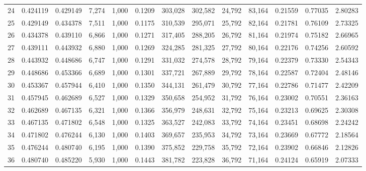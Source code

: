 \begin{tabular}{rrrrrrrrrrrrr}
24  &  0.424119 &  0.429149 &   7,274 &  1,000 &                                     0.1209 &  303,028 &  302,582 &   24,792 &   83,164 &  0.21559 &  0.77035 &  2.80283 \\
25  &  0.429149 &  0.434378 &   7,511 &  1,000 &                                     0.1175 &  310,539 &  295,071 &   25,792 &   82,164 &  0.21781 &  0.76109 &  2.73325 \\
26  &  0.434378 &  0.439110 &   6,866 &  1,000 &                                     0.1271 &  317,405 &  288,205 &   26,792 &   81,164 &  0.21974 &  0.75182 &  2.66965 \\
27  &  0.439111 &  0.443932 &   6,880 &  1,000 &                                     0.1269 &  324,285 &  281,325 &   27,792 &   80,164 &  0.22176 &  0.74256 &  2.60592 \\
28  &  0.443932 &  0.448686 &   6,747 &  1,000 &                                     0.1291 &  331,032 &  274,578 &   28,792 &   79,164 &  0.22379 &  0.73330 &  2.54343 \\
29  &  0.448686 &  0.453366 &   6,689 &  1,000 &                                     0.1301 &  337,721 &  267,889 &   29,792 &   78,164 &  0.22587 &  0.72404 &  2.48146 \\
30  &  0.453367 &  0.457944 &   6,410 &  1,000 &                                     0.1350 &  344,131 &  261,479 &   30,792 &   77,164 &  0.22786 &  0.71477 &  2.42209 \\
31  &  0.457945 &  0.462689 &   6,527 &  1,000 &                                     0.1329 &  350,658 &  254,952 &   31,792 &   76,164 &  0.23002 &  0.70551 &  2.36163 \\
32  &  0.462689 &  0.467135 &   6,321 &  1,000 &                                     0.1366 &  356,979 &  248,631 &   32,792 &   75,164 &  0.23213 &  0.69625 &  2.30308 \\
33  &  0.467135 &  0.471802 &   6,548 &  1,000 &                                     0.1325 &  363,527 &  242,083 &   33,792 &   74,164 &  0.23451 &  0.68698 &  2.24242 \\
34  &  0.471802 &  0.476244 &   6,130 &  1,000 &                                     0.1403 &  369,657 &  235,953 &   34,792 &   73,164 &  0.23669 &  0.67772 &  2.18564 \\
35  &  0.476244 &  0.480740 &   6,195 &  1,000 &                                     0.1390 &  375,852 &  229,758 &   35,792 &   72,164 &  0.23902 &  0.66846 &  2.12826 \\
36  &  0.480740 &  0.485220 &   5,930 &  1,000 &                                     0.1443 &  381,782 &  223,828 &   36,792 &   71,164 &  0.24124 &  0.65919 &  2.07333 \\

\end{tabular}
